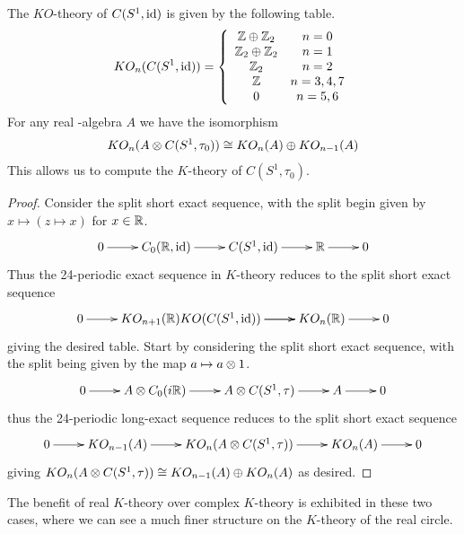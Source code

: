 \begin{theorem}\label{ktheorys1}
	The $KO$-theory of $C(S^1,\operatorname{id})$ is given by the following table. 
	\begin{align*}
		KO_n(C(S^1,\operatorname{id}))=\left \{ \begin{array}{c c} \mathbb{Z}\oplus \mathbb{Z}_2 & n=0 \\ \mathbb{Z}_2\oplus \mathbb{Z}_2 & n=1 \\ \mathbb{Z}_2 & n=2 \\ \mathbb{Z} & n=3,4,7 \\ 0 & n=5,6 \end{array} \right .
	\end{align*}
	For any real \Cstar-algebra $A$ we have the isomorphism 
	\begin{align*}
		KO_n(A\otimes C(S^1,\tau_0))\cong KO_n(A)\oplus KO_{n-1}(A)
	\end{align*}
	This allows us to compute the $K$-theory of $C(S^1,\tau_0)$.
\end{theorem}
\begin{proof}
	Consider the split short exact sequence, with the split begin given by $x \mapsto (z\mapsto x)$ for $x\in \mathbb{R}$. 
	\begin{align*}
		\xymatrix{
			0\ar[r] & C_0(\R,\id) \ar[r] & C(S^1,\id) \ar[r] & \R \ar[r] & 0 
		}
	\end{align*}
	Thus the 24-periodic exact sequence in $K$-theory reduces to the split short exact sequence 
	\begin{align*}
	\xymatrix{
		0 \ar[r] & KO_{n+1}(\R) \ar[r] KO(C(S^1,\id)) \ar[r] & KO_n(\R) \ar[r] & 0
		}
	\end{align*}
	giving the desired table. 
	Start by considering the split short exact sequence, with the split being given by the map $a\mapsto a\otimes 1$.
	\begin{align*}
	\xymatrix{
		0\ar[r] & A\tens C_0(i\R) \ar[r] & A\tens C(S^1,\tau) \ar[r] & A \ar[r] & 0
		}
	\end{align*}
	thus the 24-periodic long-exact sequence reduces to the split short exact sequence
	\begin{align*}
		\xymatrix{
			0\ar[r] & KO_{n-1}(A) \ar[r] & KO_n(A\tens C(S^1,\tau)) \ar[r] & KO_n(A) \ar[r] & 0
		}
	\end{align*}
	giving $KO_n(A\otimes C(S^1,\tau))\cong  KO_{n-1}(A)\oplus  KO_n(A)$ as desired. 
\end{proof}
The benefit of real $K$-theory over complex $K$-theory is exhibited in these two cases, where we can see a much finer structure on the $K$-theory of the real circle.

